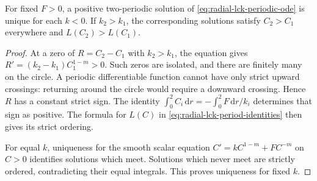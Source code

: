 \begin{lemma}\label{lem:radial-lck-periodic-order}
For fixed $F>0$, a positive two-periodic solution of \eqref{eq:radial-lck-periodic-ode} is unique for each $k<0$. If $k_2>k_1$, the corresponding solutions satisfy $C_2>C_1$ everywhere and $L(C_2)>L(C_1)$.
\end{lemma}
\begin{proof}
At a zero of $R=C_2-C_1$ with $k_2>k_1$, the equation gives $R'=(k_2-k_1)C_1^{1-m}>0$. Such zeros are isolated, and there are finitely many on the circle. A periodic differentiable function cannot have only strict upward crossings: returning around the circle would require a downward crossing. Hence $R$ has a constant strict sign. The identity $\int_0^2C_i\,\mathrm dr=-\int_0^2F\,\mathrm dr/k_i$ determines that sign as positive. The formula for $L(C)$ in \eqref{eq:radial-lck-period-identities} then gives its strict ordering.

For equal $k$, uniqueness for the smooth scalar equation $C'=kC^{1-m}+FC^{-m}$ on $C>0$ identifies solutions which meet. Solutions which never meet are strictly ordered, contradicting their equal integrals. This proves uniqueness for fixed $k$.
\end{proof}

